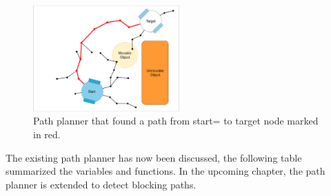 \begin{figure}[H]
    \centering

    \includegraphics[width=0.5\textwidth, cfbox=my_grey 5pt 0pt]{figures/required_background/mp/7mp_path_found.drawio.png}
    \caption{Path planner that found a path from start= to target node marked in red.}
    \label{fig:motion_planner_adding_one_node_final}
\end{figure}

The existing path planner has now been discussed, the following table summarized the variables and functions. In the upcoming chapter, the path planner is extended to detect blocking paths.\bs

